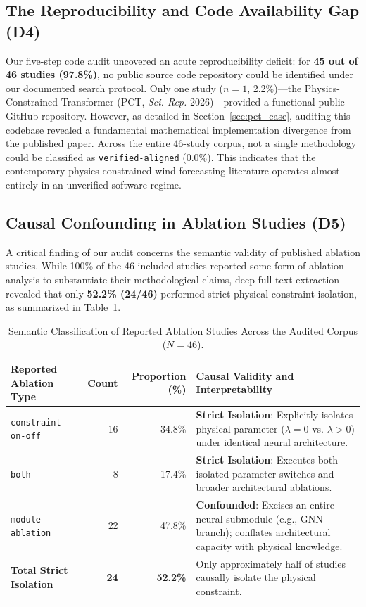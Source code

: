 \documentclass[preprint,3p,times]{elsarticle}
\begin{document}
\subsection{The Reproducibility and Code Availability Gap (D4)}
Our five-step code audit uncovered an acute reproducibility deficit: for \textbf{45 out of 46 studies (97.8\%)}, no public source code repository could be identified under our documented search protocol. Only one study ($n=1$, 2.2\%)---the Physics-Constrained Transformer (PCT, \textit{Sci. Rep.} 2026)---provided a functional public GitHub repository. However, as detailed in Section~\ref{sec:pct_case}, auditing this codebase revealed a fundamental mathematical implementation divergence from the published paper. Across the entire 46-study corpus, not a single methodology could be classified as \texttt{verified-aligned} (0.0\%). This indicates that the contemporary physics-constrained wind forecasting literature operates almost entirely in an unverified software regime.

\subsection{Causal Confounding in Ablation Studies (D5)}
A critical finding of our audit concerns the semantic validity of published ablation studies. While 100\% of the 46 included studies reported some form of ablation analysis to substantiate their methodological claims, deep full-text extraction revealed that only \textbf{52.2\% (24/46)} performed strict physical constraint isolation, as summarized in Table~\ref{tab:ablation_breakdown}.

\begin{table}[H]
\centering
\small
\caption{Semantic Classification of Reported Ablation Studies Across the Audited Corpus ($N=46$).}
\label{tab:ablation_breakdown}
\begin{tabular}{lrrp{6.8cm}}
\toprule
\textbf{Reported Ablation Type} & \textbf{Count} & \textbf{Proportion (\%)} & \textbf{Causal Validity and Interpretability} \\
\midrule
\texttt{constraint-on-off} & 16 & 34.8\% & \textbf{Strict Isolation}: Explicitly isolates physical parameter ($\lambda=0$ vs. $\lambda > 0$) under identical neural architecture. \\
\texttt{both} & 8 & 17.4\% & \textbf{Strict Isolation}: Executes both isolated parameter switches and broader architectural ablations. \\
\texttt{module-ablation} & 22 & 47.8\% & \textbf{Confounded}: Excises an entire neural submodule (e.g., GNN branch); conflates architectural capacity with physical knowledge. \\
\midrule
\textbf{Total Strict Isolation} & \textbf{24} & \textbf{52.2\%} & Only approximately half of studies causally isolate the physical constraint. \\
\bottomrule
\end{tabular}
\end{table}
\end{document}
